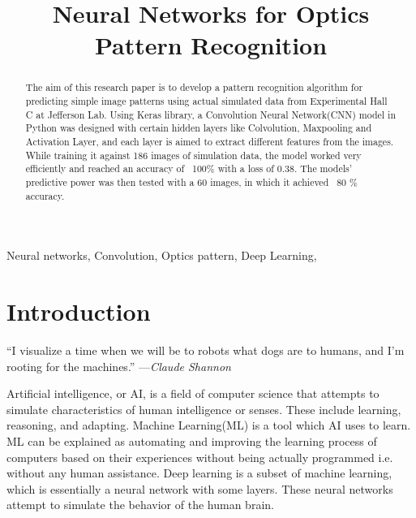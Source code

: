 \documentclass[conference]{IEEEtran}
\begin{document}

\title{Neural Networks for Optics Pattern Recognition
}

\author{
} 

\maketitle

\thispagestyle{plain}
\pagestyle{plain}
\begin{abstract}
The aim of this research paper is to develop a pattern recognition algorithm for predicting
simple image patterns using actual simulated data from Experimental Hall C at Jefferson Lab. 
Using Keras library, a Convolution Neural Network(CNN) model in Python was designed with certain hidden layers like Colvolution, Maxpooling and Activation Layer, and each layer is aimed to extract different features from the images.
While training it against 186 images of simulation data, the model worked very efficiently and reached an accuracy of ~100\% with a loss of 0.38. The models' predictive power was then tested with a 60 images, in which it achieved ~80 \% accuracy.\\
\end{abstract}

\begin{IEEEkeywords}
Neural networks, Convolution, Optics pattern, Deep Learning, 
\end{IEEEkeywords}

\section{\textbf{Introduction}}

“I visualize a time when we will be to robots what dogs are to humans, and I’m rooting for the machines.” —\emph{Claude Shannon}

Artificial intelligence, or AI, is a field of computer science that attempts to simulate characteristics of human intelligence or senses. These include learning, reasoning, and adapting. 
Machine Learning(ML) is a tool which AI uses to learn. ML can be explained as automating and improving the learning process of computers based on their experiences without being actually programmed i.e. without any human assistance.
Deep learning is a subset of machine learning, which is essentially a neural network with some layers. These neural networks attempt to simulate the behavior of the human brain.
\end{document}

